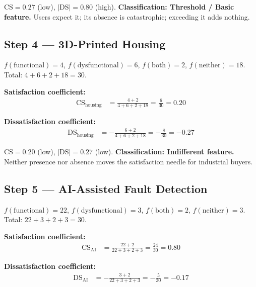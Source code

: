 \noindent
$\mathrm{CS} = 0.27$ (low), $|\mathrm{DS}| = 0.80$ (high).
\textbf{Classification: Threshold / Basic feature.}
Users expect it; its absence is catastrophic; exceeding it adds nothing.

\subsection{Step 4 --- 3D-Printed Housing}
\label{subsec:ch2-ex-housing}

$f(\text{functional}) = 4$,
$f(\text{dysfunctional}) = 6$,
$f(\text{both}) = 2$,
$f(\text{neither}) = 18$.
Total: $4 + 6 + 2 + 18 = 30$. \checkmark

\noindent
\textbf{Satisfaction coefficient:}
\begin{align}
  \mathrm{CS}_{\text{housing}} &= \frac{4 + 2}{4 + 6 + 2 + 18}
  = \frac{6}{30}
  = 0.20
  \label{eq:ch2-cs-housing}
\end{align}

\noindent
\textbf{Dissatisfaction coefficient:}
\begin{align}
  \mathrm{DS}_{\text{housing}} &= -\frac{6 + 2}{4 + 6 + 2 + 18}
  = -\frac{8}{30}
  = -0.27
  \label{eq:ch2-ds-housing}
\end{align}

\noindent
$\mathrm{CS} = 0.20$ (low), $|\mathrm{DS}| = 0.27$ (low).
\textbf{Classification: Indifferent feature.}
Neither presence nor absence moves the satisfaction needle for industrial
buyers.

\subsection{Step 5 --- AI-Assisted Fault Detection}
\label{subsec:ch2-ex-ai}

$f(\text{functional}) = 22$,
$f(\text{dysfunctional}) = 3$,
$f(\text{both}) = 2$,
$f(\text{neither}) = 3$.
Total: $22 + 3 + 2 + 3 = 30$. \checkmark

\noindent
\textbf{Satisfaction coefficient:}
\begin{align}
  \mathrm{CS}_{\text{AI}} &= \frac{22 + 2}{22 + 3 + 2 + 3}
  = \frac{24}{30}
  = 0.80
  \label{eq:ch2-cs-ai}
\end{align}

\noindent
\textbf{Dissatisfaction coefficient:}
\begin{align}
  \mathrm{DS}_{\text{AI}} &= -\frac{3 + 2}{22 + 3 + 2 + 3}
  = -\frac{5}{30}
  = -0.17
  \label{eq:ch2-ds-ai}
\end{align}

